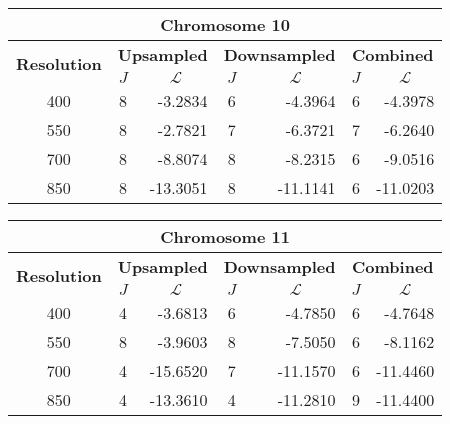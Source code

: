 \begin{table}[h!]
  \centering
\begin{tabular}{|c|c|r|c|r|c|r|}\hline
\multicolumn{7}{|c|}{\textbf{Chromosome 10}} \\ \hline
\multirow{2}{*}{\textbf{Resolution}} & \multicolumn{2}{|c|}{\textbf{Upsampled}} &  \multicolumn{2}{|c|}{\textbf{Downsampled}} &  \multicolumn{2}{|c|}{\textbf{Combined}} \\ \cline{2-7}
    & $J$ & \multicolumn{1}{|c|}{\textbf{$\mathcal{L}$}} & $J$ & \multicolumn{1}{|c|}{\textbf{$\mathcal{L}$}} &$J$ & \multicolumn{1}{|c|}{\textbf{$\mathcal{L}$}}   \\ \hline
400 & 8 & -3.2834 & 6 & -4.3964 & 6 & -4.3978  \\ \hline
550 & 8 & -2.7821 & 7 & -6.3721 & 7 & -6.2640  \\ \hline
700 & 8 & -8.8074 & 8 & -8.2315 & 6 & -9.0516  \\ \hline
850 & 8 & -13.3051 & 8 & -11.1141 & 6 & -11.0203  \\ \hline
\end{tabular}
\end{table}



\begin{table}[h!]
  \centering
\begin{tabular}{|c|c|r|c|r|c|r|}\hline
\multicolumn{7}{|c|}{\textbf{Chromosome 11}} \\ \hline
\multirow{2}{*}{\textbf{Resolution}} & \multicolumn{2}{|c|}{\textbf{Upsampled}} &  \multicolumn{2}{|c|}{\textbf{Downsampled}} &  \multicolumn{2}{|c|}{\textbf{Combined}} \\ \cline{2-7}
    & $J$ & \multicolumn{1}{|c|}{\textbf{$\mathcal{L}$}} & $J$ & \multicolumn{1}{|c|}{\textbf{$\mathcal{L}$}} &$J$ & \multicolumn{1}{|c|}{\textbf{$\mathcal{L}$}}   \\ \hline
400 & 4 & -3.6813 & 6 & -4.7850 & 6 & -4.7648  \\ \hline
550 & 8 & -3.9603 & 8 & -7.5050 & 6 & -8.1162  \\ \hline
700 & 4 & -15.6520 & 7 & -11.1570 & 6 & -11.4460  \\ \hline
850 & 4 & -13.3610 & 4 & -11.2810 & 9 & -11.4400  \\ \hline
\end{tabular}
\end{table}

